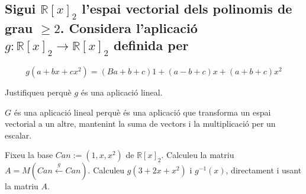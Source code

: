 \documentclass[a4paper, 12pt]{article}
\begin{document}
    \subsection{Sigui $\mathbb{R}[x]_2$ l'espai vectorial dels polinomis de grau $\geq 2$.
    Considera l'aplicació $g: \mathbb{R}[x]_2 \rightarrow \mathbb{R}[x]_2$ definida per}
    \begin{displaymath}
        g(a+bx+cx^2) = (Ba+b+c)1 + (a-b+c)x + (a+b+c)x^2
    \end{displaymath}
    \begin{exercici}
        Justifiqueu perquè $g$ és una aplicació lineal.
    \end{exercici}
    \begin{solucio}
        $G$ és una aplicació lineal perquè és una aplicació que transforma un espai vectorial a un
        altre, mantenint la suma de vectors i la multiplicació per un escalar.
    \end{solucio}
    \begin{exercici}
        Fixeu la base $Can := (1, x, x^2)$ de $\mathbb{R}[x]_2$. Calculeu la matriu $A = M(Can \xleftarrow{g} Can)$.
        Calculeu $g(3+2x+x^2)$ i $g^{-1}(x)$, directament i usant la matriu $A$.
    \end{exercici}
\end{document}
